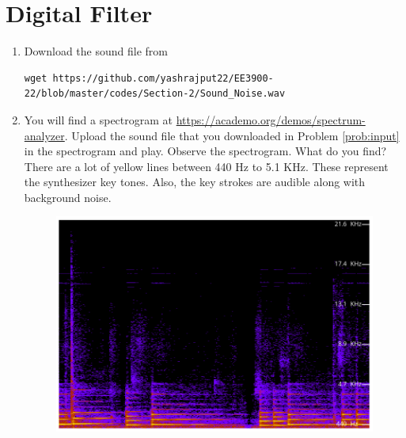 \documentclass[journal,12pt,twocolumn]{IEEEtran}
\renewcommand\thesection{\arabic{section}}
\begin{document}
\section{Digital Filter}
\begin{enumerate}[label=\thesection.\arabic*
,ref=\thesection.\theenumi]
\item
\label{prob:input}
Download the sound file from  
\begin{lstlisting}
wget https://github.com/yashrajput22/EE3900-22/blob/master/codes/Section-2/Sound_Noise.wav
\end{lstlisting}
\item
\label{prob:spectrogram}
You will find a spectrogram at \href{https://academo.org/demos/spectrum-analyzer}{\url{https://academo.org/demos/spectrum-analyzer}}. 
%
Upload the sound file that you downloaded in Problem \ref{prob:input} in the spectrogram  and play.  Observe the spectrogram. What do you find?
\\
%
\solution There are a lot of yellow lines between 440 Hz to 5.1 KHz.  These represent the synthesizer key tones. Also, the key strokes
are audible along with background noise.
\begin{figure}[!ht]
	\begin{center}
	\includegraphics[width=\columnwidth]{./figs/2_2}
	\end{center}

\end{figure}
\end{enumerate}
\end{document}
